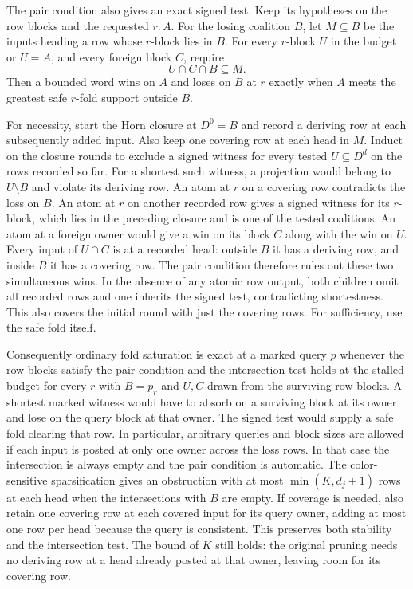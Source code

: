 The pair condition also gives an exact signed test.
Keep its hypotheses on the row blocks and the requested
$r:A$. For the losing coalition $B$, let $M\subseteq B$
be the inputs heading a row whose $r$-block lies in $B$.
For every $r$-block $U$ in the budget or $U=A$, and
every foreign block $C$, require
\[
                       U\cap C\cap B\subseteq M.
\]
Then a bounded word wins on $A$ and loses on $B$ at $r$
exactly when $A$ meets the greatest safe $r$-fold support
outside $B$.

For necessity, start the Horn closure at $D^0=B$ and
record a deriving row at each subsequently added input.
Also keep one covering row at each head in $M$.
Induct on the closure rounds to exclude a signed witness
for every tested $U\subseteq D^d$ on the rows recorded so
far. For a shortest such witness, a projection would
belong to $U\setminus B$ and violate its deriving row.
An atom at $r$ on a covering row contradicts the loss on
$B$. An atom at $r$ on another recorded row gives a
signed witness for its $r$-block, which lies in the
preceding closure and is one of the tested coalitions.
An atom at a foreign owner would give a win on its block
$C$ along with the win on $U$. Every input of $U\cap C$
is at a recorded head: outside $B$ it has a deriving row,
and inside $B$ it has a covering row. The pair condition
therefore rules out these two simultaneous wins. In the
absence of any atomic row output, both children omit
all recorded rows and one inherits the signed test,
contradicting shortestness. This also covers the initial
round with just the covering rows. For sufficiency, use
the safe fold itself.

Consequently ordinary fold saturation is exact at a
marked query $p$ whenever the row blocks satisfy the
pair condition and the intersection test holds at the
stalled budget for every $r$ with $B=p_r$ and $U,C$ drawn
from the surviving row blocks. A shortest marked witness
would have to absorb on a surviving block at its owner
and lose on the query block at that owner. The signed
test would supply a safe fold clearing that row.
In particular, arbitrary queries and block sizes are
allowed if each input is posted at only one owner across
the loss rows. In that case the intersection is always
empty and the pair condition is automatic.
The color-sensitive sparsification gives an obstruction
with at most $\min(K,d_j+1)$ rows at each head when the
intersections with $B$ are empty. If coverage is needed,
also retain one covering row at each covered input for
its query owner, adding at most one row per head because
the query is consistent. This preserves both stability
and the intersection test. The bound of $K$ still holds:
the original pruning needs no deriving row at a head
already posted at that owner, leaving room for its
covering row.

